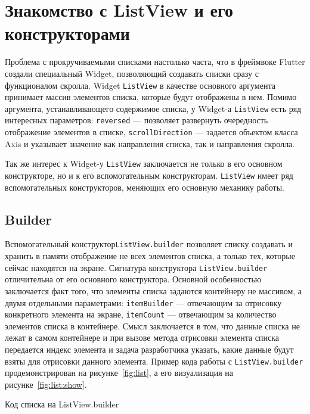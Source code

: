 \section{Знакомство с ListView и его конструкторами}

Проблема с прокручиваемыми списками настолько часта,
что в фреймвоке Flutter создали специальный Widget,
позволяющий создавать списки сразу с функционалом скролла.
Widget \texttt{ListView} в качестве основного аргумента принимает
массив элементов списка, которые будут отображены в нем.
Помимо аргумента, устанавливающего содержимое списка,
у Widget-а \texttt{ListView} есть ряд интересных параметров:
\texttt{reversed} --- позволяет развернуть очередность отображение элементов
в списке, \texttt{scrollDirection} --- задается объектом класса Axis
и указывает значение как направления списка, так и направления скролла.\par
Так же интерес к Widget-у \texttt{ListView} заключается не только
в его основном конструкторе, но и к его вспомогательным конструкторам.
\texttt{ListView} имеет ряд вспомогательных конструкторов,
меняющих его основную механику работы.

\subsection{Builder}

Вспомогательный конструктор\texttt{ListView.builder} 
позволяет списку создавать и хранить в памяти отображение
не всех элементов списка, а только тех, которые сейчас находятся на экране.
Сигнатура конструктора \texttt{ListView.builder} отличительна
от его основного конструктора.
Основной особенностью заключается факт того,
что элементы списка задаются контейнеру не массивом,
а двумя отдельными параметрами:
\texttt{itemBuilder} --- отвечающим за отрисовку конкретного элемента
на экране, \texttt{itemCount} --- отвечающим
за количество элементов списка в контейнере.
Смысл заключается в том, что данные списка не лежат в самом контейнере
и при вызове метода отрисовки элемента списка передается индекс элемента
и задача разработчика указать, какие данные будут взяты для отрисовки данного
элемента. Пример кода работы с \texttt{ListView.builder}
продемонстрирован на рисунке~\ref{fig:list},
а его визуализация на рисунке~\ref{fig:list:show}.

\begin{image}
	\caption{Код списка на ListView.builder}
	\label{fig:list}
\end{image}

